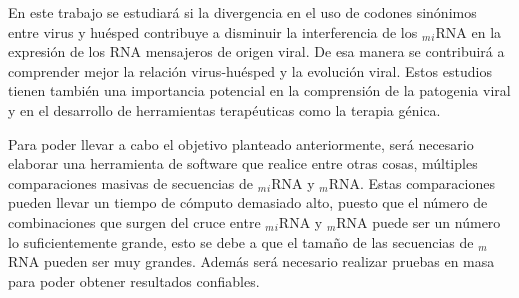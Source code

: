 \par En este trabajo se estudiará si la divergencia en el uso de codones sinónimos entre virus y huésped contribuye a disminuir la interferencia de los $_m$$_i$RNA en la expresión de los RNA mensajeros de origen viral. De esa manera se contribuirá a comprender mejor la relación virus-huésped y la evolución viral. Estos estudios tienen también una importancia potencial en la comprensión de la patogenia viral y en el desarrollo de herramientas terapéuticas como la terapia génica.

\par Para poder llevar a cabo el objetivo planteado anteriormente, será necesario elaborar una herramienta de software que realice entre otras cosas, múltiples comparaciones masivas de secuencias de $_m$$_i$RNA y $_m$RNA. Estas comparaciones pueden llevar un tiempo de cómputo demasiado alto, puesto que el número de combinaciones que surgen del cruce entre $_m$$_i$RNA y $_m$RNA puede ser un número lo suficientemente grande, esto se debe a que el tamaño de las secuencias de $_m$RNA pueden ser muy grandes. Además será necesario realizar pruebas en masa para poder obtener resultados confiables.
